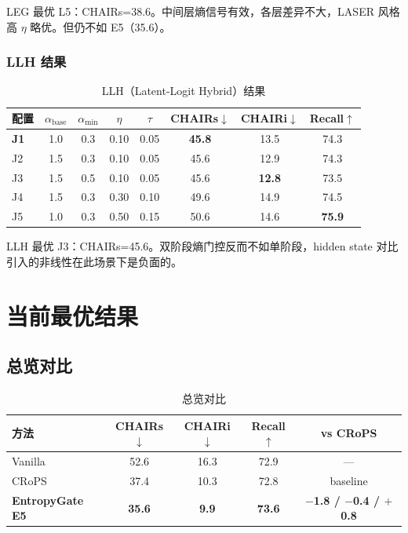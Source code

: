 \documentclass[12pt,a4paper]{ctexart}
\begin{document}
LEG 最优 L5：CHAIRs=38.6。中间层熵信号有效，各层差异不大，LASER 风格高 $\eta$ 略优。但仍不如 E5（35.6）。

\subsubsection{LLH 结果}

\begin{table}[H]
\centering
\caption{LLH（Latent-Logit Hybrid）结果}
\label{tab:llh}
\begin{tabular}{lccccccc}
\toprule
\textbf{配置} & $\alpha_{\text{base}}$ & $\alpha_{\min}$ & $\eta$ & $\tau$ & \textbf{CHAIRs$\downarrow$} & \textbf{CHAIRi$\downarrow$} & \textbf{Recall$\uparrow$} \\
\midrule
\textbf{J1} & 1.0 & 0.3 & 0.10 & 0.05 & \textbf{45.8} & 13.5 & 74.3 \\
J2 & 1.5 & 0.3 & 0.10 & 0.05 & 45.6 & 12.9 & 74.3 \\
J3 & 1.5 & 0.5 & 0.10 & 0.05 & 45.6 & \textbf{12.8} & 73.5 \\
J4 & 1.5 & 0.3 & 0.30 & 0.10 & 49.6 & 14.9 & 74.5 \\
J5 & 1.0 & 0.3 & 0.50 & 0.15 & 50.6 & 14.6 & \textbf{75.9} \\
\bottomrule
\end{tabular}
\end{table}

LLH 最优 J3：CHAIRs=45.6。双阶段熵门控反而不如单阶段，hidden state 对比引入的非线性在此场景下是负面的。

\section{当前最优结果}

\subsection{总览对比}

\begin{table}[H]
\centering
\caption{总览对比}
\label{tab:final}
\begin{tabular}{lcccc}
\toprule
\textbf{方法} & \textbf{CHAIRs$\downarrow$} & \textbf{CHAIRi$\downarrow$} & \textbf{Recall$\uparrow$} & \textbf{vs CRoPS} \\
\midrule
Vanilla & 52.6 & 16.3 & 72.9 & — \\
CRoPS   & 37.4 & 10.3 & 72.8 & baseline \\
\textbf{EntropyGate E5} & \textbf{35.6} & \textbf{9.9} & \textbf{73.6} & \textbf{$-$1.8 / $-$0.4 / $+$0.8} \\
\bottomrule
\end{tabular}
\end{table}
\end{document}
